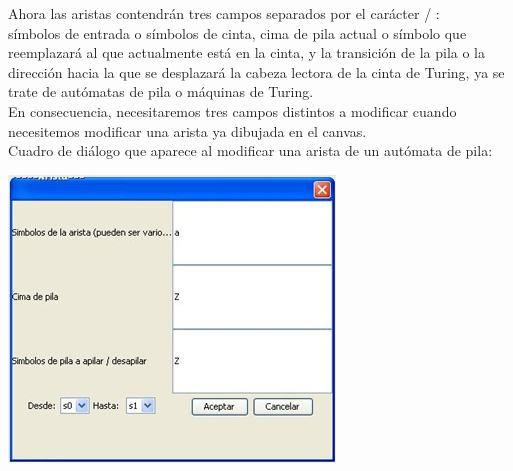 \documentclass[12pt,a4paper,spanish]{book}
\begin{document}
\begin{itemize}
Ahora las aristas contendr\'an tres campos separados por el car\'acter / :\\
s\'imbolos de entrada o s\'imbolos de cinta, cima de pila actual o s\'imbolo que reemplazar\'a al que actualmente est\'a en la cinta, y la transici\'on de la pila o la direcci\'on hacia la que se desplazar\'a la cabeza lectora de la cinta de Turing, ya se trate de aut\'omatas de pila o m\'aquinas de Turing.\\ En consecuencia, necesitaremos tres campos distintos a modificar cuando necesitemos modificar una arista ya dibujada en el canvas.\\

Cuadro de di\'alogo que aparece al modificar una arista de un aut\'omata de pila:\\
\begin{center}
\includegraphics{roci6.jpg}
\end{center}
\end{itemize}
\end{document}
